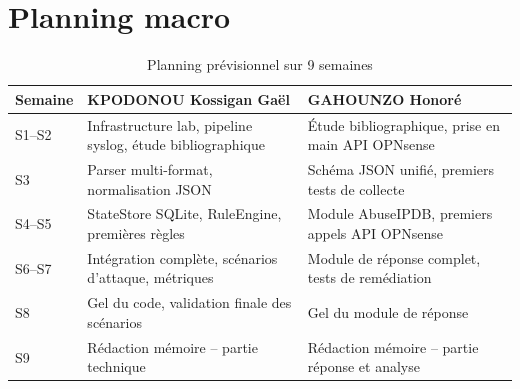 \documentclass[a4paper,12pt]{article}
\begin{document}
\section{Planning macro}

\begin{table}[H]
\centering
\small
\renewcommand{\arraystretch}{1.4}
\begin{tabular}{|p{}|p{}|p{}|}
\hline
\textbf{Semaine} & \textbf{KPODONOU Kossigan Gaël} & \textbf{GAHOUNZO Honoré} \\
\hline
S1--S2 & Infrastructure lab, pipeline syslog, étude bibliographique & Étude bibliographique, prise en main API OPNsense \\
\hline
S3 & Parser multi-format, normalisation JSON & Schéma JSON unifié, premiers tests de collecte \\
\hline
S4--S5 & StateStore SQLite, RuleEngine, premières règles & Module AbuseIPDB, premiers appels API OPNsense \\
\hline
S6--S7 & Intégration complète, scénarios d'attaque, métriques & Module de réponse complet, tests de remédiation \\
\hline
S8 & Gel du code, validation finale des scénarios & Gel du module de réponse \\
\hline
S9 & Rédaction mémoire -- partie technique & Rédaction mémoire -- partie réponse et analyse \\
\hline
\end{tabular}
\caption*{Planning prévisionnel sur 9 semaines}
\end{table}
\end{document}
